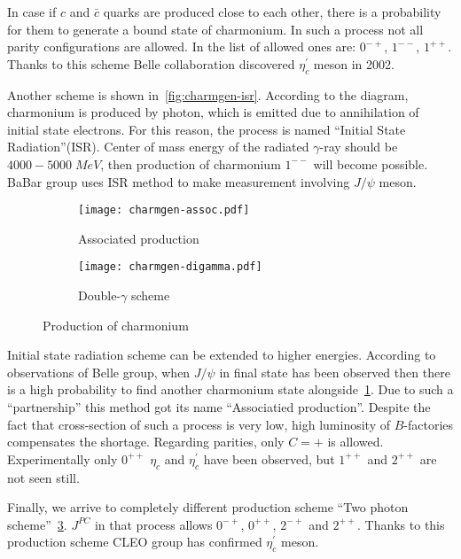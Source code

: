 In case if $c$ and $\bar{c}$ quarks are produced close to each other, there is a probability for them to generate a bound state of charmonium. In such a process not all parity configurations are allowed. In the list of allowed ones are: $0^{-+}$, $1^{--}$, $1^{++}$. Thanks to this scheme Belle collaboration discovered $\eta^\prime_c$ meson in 2002.~\cite{bdecay-etacprime}

Another scheme is shown in~\cref{fig:charmgen-isr}. According to the diagram, charmonium is produced by photon, which is emitted due to annihilation of initial state electrons. For this reason, the process is named ``Initial State Radiation''(ISR). Center of mass energy of the radiated $\gamma$-ray should be $4000-5000\;MeV$, then production of charmonium $1^{--}$ will become possible. BaBar group uses ISR method to make measurement involving $J/\psi$ meson.~\cite{isr-jpsi}

\begin{figure}[H]
    \centering
    \begin{subfigure}[b]{0.4\textwidth}
        \texttt{[image: charmgen-assoc.pdf]}
        \caption{Associated production} \label{fig:charmgen-assoc}
    \end{subfigure}
    \begin{subfigure}[b]{0.4\textwidth}
        \texttt{[image: charmgen-digamma.pdf]}
        \caption{Double-$\gamma$ scheme} \label{fig:charmgen-digamma}
    \end{subfigure}
    \caption{Production of charmonium}
\end{figure}

Initial state radiation scheme can be extended to higher energies. According to observations of Belle group, when $J/\psi$ in final state has been observed then there is a high probability to find another charmonium state alongside~\cref{fig:charmgen-assoc}. Due to such a ``partnership'' this method got its name ``Associatied production''. Despite the fact that cross-section of such a process is very low, high luminosity of $B$-factories compensates  the shortage. Regarding parities, only $C=+$ is allowed. Experimentally only $0^{++}$ $\eta_c$ and $\eta_c^\prime$ have been observed, but $1^{++}$ and $2^{++}$ are not seen still.~\cite{assoc-prod}

Finally, we arrive to completely different production scheme ``Two photon scheme''~\cref{fig:charmgen-digamma}. $J^{PC}$ in that process allows $0^{-+}$, $0^{++}$, $2^{-+}$ and $2^{++}$. Thanks to this production scheme CLEO group has confirmed $\eta_c^\prime$ meson.~\cite{digamma}

